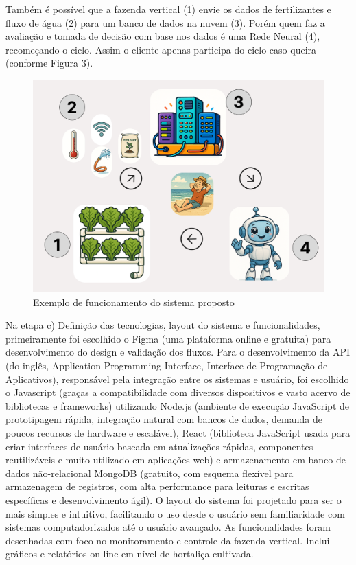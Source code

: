 Também é possível que a fazenda vertical (1) envie os dados de fertilizantes e fluxo de água (2) para um banco de dados na nuvem (3). Porém quem faz a avaliação e tomada de decisão com base nos dados é uma Rede Neural (4), recomeçando o ciclo. Assim o cliente apenas participa do ciclo caso queira (conforme Figura 3).

\begin{figure}[H]
    \centering
    \includegraphics[scale=0.2]{Illustrations/Figura 3.png} %
    \caption{Exemplo de funcionamento do sistema proposto}
    \label{fcht:figura3}
\end{figure}

Na etapa c) Definição das tecnologias, layout do sistema e funcionalidades, primeiramente foi escolhido o Figma (uma plataforma online e gratuita) para desenvolvimento do design e validação dos fluxos. Para o desenvolvimento da API (do inglês, Application Programming Interface, Interface de Programação de Aplicativos), responsável pela integração entre os sistemas e usuário, foi escolhido o Javascript (graças a compatibilidade com diversos dispositivos e vasto acervo de bibliotecas e frameworks) utilizando Node.js (ambiente de execução JavaScript de prototipagem rápida, integração natural com bancos de dados, demanda de poucos recursos de hardware e escalável), React (biblioteca JavaScript usada para criar interfaces de usuário baseada em atualizações rápidas, componentes reutilizáveis e muito utilizado em aplicações web) e armazenamento em banco de dados não-relacional MongoDB (gratuito, com esquema flexível para armazenagem de registros, com alta performance para leituras e escritas específicas e desenvolvimento ágil).
O layout do sistema foi projetado para ser o mais simples e intuitivo, facilitando o uso desde o usuário sem familiaridade com sistemas computadorizados até o usuário avançado. 
As funcionalidades foram desenhadas com foco no monitoramento e controle da fazenda vertical. Inclui gráficos e relatórios on-line em nível de hortaliça cultivada.

